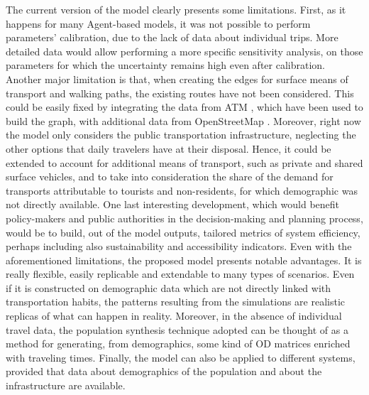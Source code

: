 The current version of the model clearly presents some limitations. First, as it happens for many Agent-based models, it was not possible to perform parameters' calibration, due to the lack of data about individual trips. More detailed data would allow performing a more specific sensitivity analysis, on those parameters for which the uncertainty remains high even after calibration. Another major limitation is that, when creating the edges for surface means of transport and walking paths, the existing routes have not been considered. This could be easily fixed by integrating the data from ATM \cite{site1, site2, site3, site4, site5, site6, site7, site8}, which have been used to build the graph, with additional data from OpenStreetMap \cite{site9}. Moreover, right now the model only considers the public transportation infrastructure, neglecting the other options that daily travelers have at their disposal. Hence, it could be extended to account for additional means of transport, such as private and shared surface vehicles, and to take into consideration the share of the demand for transports attributable to tourists and non-residents, for which demographic was not directly available. One last interesting development, which would benefit policy-makers and public authorities in the decision-making and planning process, would be to build, out of the model outputs, tailored metrics of system efficiency, perhaps including also sustainability and accessibility indicators.
Even with the aforementioned limitations, the proposed model presents notable advantages. It is really flexible, easily replicable and extendable to many types of scenarios. Even if it is constructed on demographic data which are not directly linked with transportation habits, the patterns resulting from the simulations are realistic replicas of what can happen in reality. Moreover, in the absence of individual travel data, the population synthesis technique adopted can be thought of as a method for generating, from demographics, some kind of OD matrices enriched with traveling times. Finally, the model can also be applied to different systems, provided that data about demographics of the population and about the infrastructure are available. 

